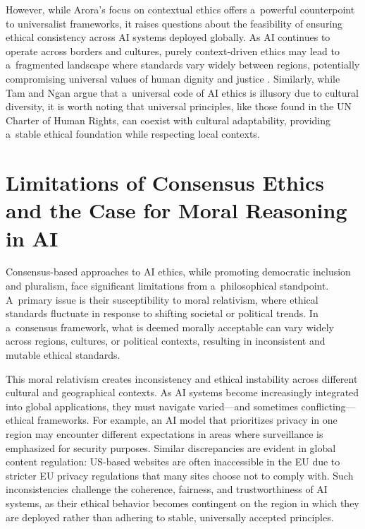 \documentclass[%
  manuscript=article,
  year=2024,
  volume=77,
  doi=10.59203/zfn.77.707,
]{zfn}
\begin{document}
However, while Arora's focus on contextual ethics offers a~powerful counterpoint to universalist frameworks, it raises questions about the feasibility of ensuring ethical consistency across AI systems deployed globally. As AI continues to operate across borders and cultures, purely context-driven ethics may lead to a~fragmented landscape where standards vary widely between regions, potentially compromising universal values of human dignity and justice 
\parencite[][]{correa_worldwide_2023}. %
 Similarly, while Tam and Ngan argue that a~universal code of AI ethics is illusory due to cultural diversity, it is worth noting that universal principles, like those found in the UN Charter of Human Rights, can coexist with cultural adaptability, providing a~stable ethical foundation while respecting local contexts.



\section{Limitations of Consensus Ethics and the Case for Moral Reasoning in AI}

Consensus-based approaches to AI ethics, while promoting democratic inclusion and pluralism, face significant limitations from a~philosophical standpoint. A~primary issue is their susceptibility to moral relativism, where ethical standards fluctuate in response to shifting societal or political trends. In a~consensus framework, what is deemed morally acceptable can vary widely across regions, cultures, or political contexts, resulting in inconsistent and mutable ethical standards.



This moral relativism creates inconsistency and ethical instability across different cultural and geographical contexts. As AI systems become increasingly integrated into global applications, they must navigate varied---and sometimes conflicting---ethical frameworks. For example, an AI model that prioritizes privacy in one region may encounter different expectations in areas where surveillance is emphasized for security purposes. Similar discrepancies are evident in global content regulation: US-based websites are often inaccessible in the EU due to stricter EU privacy regulations that many sites choose not to comply with. Such inconsistencies challenge the coherence, fairness, and trustworthiness of AI systems, as their ethical behavior becomes contingent on the region in which they are deployed rather than adhering to stable, universally accepted principles.
\end{document}
